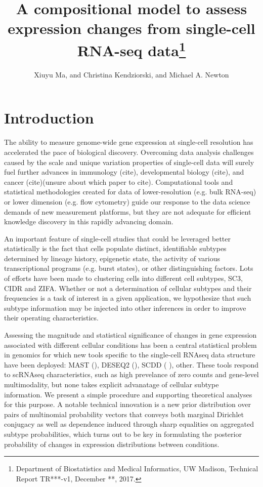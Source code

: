 \documentclass[11pt]{amsart}
\title{A compositional model to assess expression changes from
 single-cell RNA-seq data\footnote{Department of Biostatistics and Medical Informatics, UW Madison, Technical Report TR***-v1, December **, 2017.}}
\author{Xiuyu Ma,  and Christina Kendziorski, and Michael A. Newton}
\begin{document}
\maketitle
\section{Introduction}

The ability to measure genome-wide gene expression at single-cell resolution 
has accelerated the pace of biological discovery\cite{scs}.  Overcoming data
analysis challenges caused by the scale and unique variation properties of single-cell
data will surely fuel further advances in immunology (cite), developmental
biology (cite), and cancer (cite)(unsure about which paper to cite).  Computational tools and statistical methodologies 
created for data of lower-resolution (e.g. bulk RNA-seq) or lower dimension 
(e.g. flow cytometry)  guide our response to 
 the data science demands of new measurement platforms,
but they are not adequate for efficient knowledge discovery in this
rapidly advancing domain\cite{Bacher:2016aa}.

An important feature of single-cell studies that could be leveraged better
statistically is the fact that cells populate distinct, identifiable subtypes
determined by lineage history, epigenetic state, the activity
of various transcriptional programs (e.g. burst states), or other 
distinguishing factors. Lots of efforts have been made to clustering cells
into different cell subtypes, SC3\cite{sc3}, CIDR\cite{CIDR} and ZIFA\cite{ZIFA}.
Whether or not a determination of cellular subtypes and their frequencies 
is a task of interest in a given application, we hypothesize that such
subtype information may be injected into other inferences in order
 to improve their operating characteristics.

Assessing the magnitude and statistical significance of changes in gene
expression associated with different cellular conditions has been a central
statistical problem in genomics for which new tools specific to
the single-cell RNAseq data structure have been deployed: MAST (\cite{ref:MAST}),
DESEQ2 (\cite{ref:Des}), SCDD (\cite{ref:scDD} ), other.  These tools respond
to scRNAseq characteristics, such as high prevelance of zero counts and
gene-level multimodality, but none takes explicit advanatage of cellular subtype
information.  We present a simple procedure and supporting theoretical
analyses for this purpose.  A notable technical innovation is a new prior
distribution over pairs of multinomial probability vectors that conveys
both marginal Dirichlet conjugacy as well as
 dependence induced through sharp equalities on aggregated 
 subtype probabilities, which turns out to be key in formulating 
 the posterior probability of changes in expression distributions between conditions.
 
\end{document}
